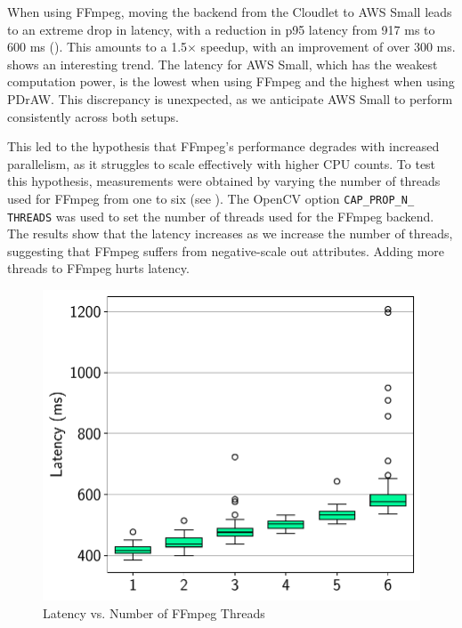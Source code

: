 When using FFmpeg, moving the backend from the Cloudlet to AWS Small leads to
an extreme drop in latency, with a reduction in p95 latency from 917 ms to 600
ms (). This amounts to a 1.5$\times$ speedup,
with an improvement of over 300 ms.  shows an interesting
trend. The latency for AWS Small, which has the weakest computation power, is
the lowest when using FFmpeg and the highest when using PDrAW.  This
discrepancy is unexpected, as we anticipate AWS Small to perform consistently
across both setups.

This led to the hypothesis that FFmpeg's performance degrades with increased
parallelism, as it struggles to scale effectively with higher CPU counts.  To
test this hypothesis, measurements were obtained by varying the number of
threads used for FFmpeg from one to six (see ).  The
OpenCV option \texttt{CAP\_\allowbreak PROP\_\allowbreak N\_\allowbreak
THREADS} was used to set the number of threads used for the FFmpeg backend.
The results show that the latency increases as we increase the number of threads,
suggesting that FFmpeg suffers from negative-scale out attributes. Adding more
threads to FFmpeg hurts latency.

\begin{figure}[htbp]
\centerline{\includegraphics[width = .4\textwidth]{figs/threads_box_plot.pdf}}
\caption{Latency vs. Number of FFmpeg Threads}
\label{fig:threads_box_plot}
\end{figure}

